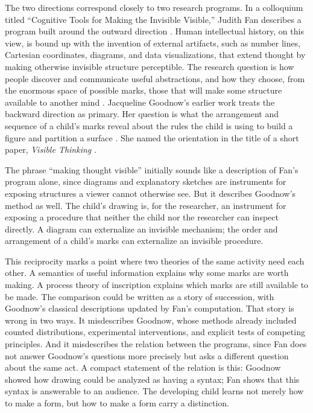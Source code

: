 \documentclass[11pt]{article}
\theoremstyle{remark}
\begin{document}
The two directions correspond closely to two research programs. In a colloquium titled ``Cognitive Tools for Making the Invisible Visible,'' Judith Fan describes a program built around the outward direction \cite{fancolloquium}. Human intellectual history, on this view, is bound up with the invention of external artifacts, such as number lines, Cartesian coordinates, diagrams, and data visualizations, that extend thought by making otherwise invisible structure perceptible. The research question is how people discover and communicate useful abstractions, and how they choose, from the enormous space of possible marks, those that will make some structure available to another mind \cite{fan2023versatile}. Jacqueline Goodnow's earlier work treats the backward direction as primary. Her question is what the arrangement and sequence of a child's marks reveal about the rules the child is using to build a figure and partition a surface \cite{goodnow1977,goodnow1973grammar}. She named the orientation in the title of a short paper, \emph{Visible Thinking} \cite{goodnow1978visible}.

The phrase ``making thought visible'' initially sounds like a description of Fan's program alone, since diagrams and explanatory sketches are instruments for exposing structures a viewer cannot otherwise see. But it describes Goodnow's method as well. The child's drawing is, for the researcher, an instrument for exposing a procedure that neither the child nor the researcher can inspect directly. A diagram can externalize an invisible mechanism; the order and arrangement of a child's marks can externalize an invisible procedure.

This reciprocity marks a point where two theories of the same activity need each other. A semantics of useful information explains why some marks are worth making. A process theory of inscription explains which marks are still available to be made. The comparison could be written as a story of succession, with Goodnow's classical descriptions updated by Fan's computation. That story is wrong in two ways. It misdescribes Goodnow, whose methods already included counted distributions, experimental interventions, and explicit tests of competing principles. And it misdescribes the relation between the programs, since Fan does not answer Goodnow's questions more precisely but asks a different question about the same act. A compact statement of the relation is this: Goodnow showed how drawing could be analyzed as having a syntax; Fan shows that this syntax is answerable to an audience. The developing child learns not merely how to make a form, but how to make a form carry a distinction.
\end{document}
